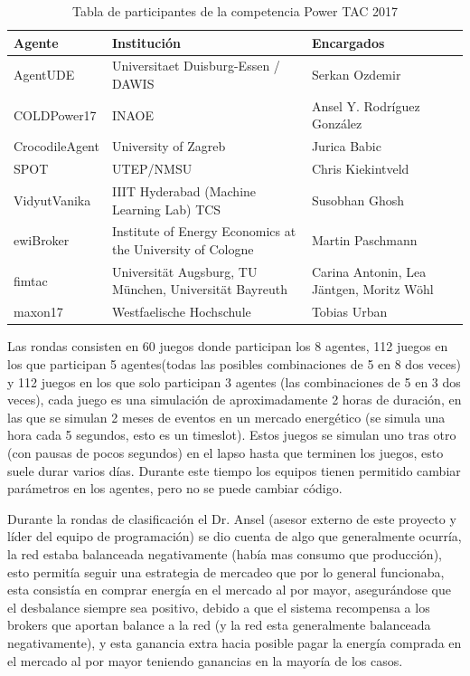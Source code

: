 \begin{table}[h!]
	\centering
	\begin{tabular}{|p{2.76cm}|p{8cm}|p{5.4cm}|} \hline
		\textbf{Agente}	 		& \textbf{Institución} 			& \textbf{Encargados} \\\hline	
	    AgentUDE	 	& Universitaet Duisburg-Essen / DAWIS 	& Serkan Ozdemir \\\hline	
    	COLDPower17		& INAOE									& Ansel Y. Rodríguez González\\\hline	
	    CrocodileAgent	& University of Zagreb					& Jurica Babic	\\\hline	
	    SPOT			& UTEP/NMSU								& Chris Kiekintveld\\\hline	
	    VidyutVanika	& IIIT Hyderabad (Machine Learning Lab) TCS & Susobhan Ghosh\\\hline	
	    ewiBroker		& Institute of Energy Economics at the University of Cologne & Martin Paschmann\\\hline	
    	fimtac			& Universität Augsburg, TU München, Universität Bayreuth& Carina Antonin, Lea Jäntgen, Moritz Wöhl\\\hline	
	    maxon17			& Westfaelische Hochschule				& Tobias Urban \\\hline
	\end{tabular}
\caption{Tabla de participantes de la competencia Power TAC 2017}
\end{table}

Las rondas consisten en 60 juegos donde participan los 8 agentes, 112 juegos en los que participan 5 agentes(todas las posibles combinaciones de 5 en 8 dos veces) y 112 juegos en los que solo participan 3 agentes (las combinaciones de 5 en 3 dos veces), cada juego es una simulación de aproximadamente 2 horas de duración, en las que se simulan 2 meses de eventos en un mercado energético (se simula una hora cada 5 segundos, esto es un timeslot). Estos juegos se simulan uno tras otro (con pausas de pocos segundos) en el lapso hasta que terminen los juegos, esto suele durar varios días. Durante este tiempo los equipos tienen permitido cambiar parámetros en los agentes, pero no se puede cambiar código. 

Durante la rondas de clasificación 
el Dr. Ansel (asesor externo de este proyecto y líder del equipo de programación) se dio cuenta de algo que generalmente ocurría, la red estaba balanceada negativamente (había mas consumo que producción), esto permitía seguir una estrategia de mercadeo que por lo general funcionaba, esta consistía en comprar energía en el mercado al por mayor, asegurándose que el desbalance siempre sea positivo, debido a que el sistema recompensa a los brokers que aportan balance a la red (y la red esta generalmente balanceada negativamente), y esta ganancia extra hacia posible pagar la energía comprada en el mercado al por mayor teniendo ganancias en la mayoría de los casos.

